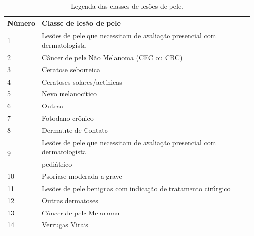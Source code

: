 \begin{table}[ht]
    \caption{\small Legenda das classes de lesões de pele.}
    \centering
    \begin{tabular}{l|l}
        \hline
        Número             & Classe de lesão de pele                                                  \\ \hline
        1                  & Lesões de pele que necessitam de avaliação presencial com dermatologista \\ \hline
        2                  & Câncer de pele Não Melanoma (CEC ou CBC)                                 \\ \hline
        3                  & Ceratose seborreica                                                      \\ \hline
        4                  & Ceratoses solares/actínicas                                              \\ \hline
        5                  & Nevo melanocítico                                                        \\ \hline
        6                  & Outras                                                                   \\ \hline
        7                  & Fotodano crônico                                                         \\ \hline
        8                  & Dermatite de Contato                                                     \\ \hline
        \multirow{2}{*}{9} & Lesões de pele que necessitam de avaliação presencial com dermatologista \\
                           & pediátrico                                                               \\ \hline
        10                 & Psoríase moderada a grave                                                \\ \hline
        11                 & Lesões de pele benignas com indicação de tratamento cirúrgico            \\ \hline
        12                 & Outras dermatoses                                                        \\ \hline
        13                 & Câncer de pele Melanoma                                                  \\ \hline
        14                 & Verrugas Virais                                                          \\ \hline

\end{tabular}
\end{table}
